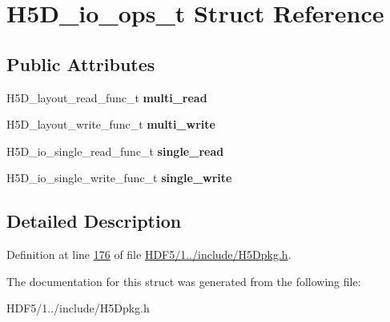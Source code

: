 \hypertarget{struct_h5_d__io__ops__t}{}\section{H5\+D\+\_\+io\+\_\+ops\+\_\+t Struct Reference}
\label{struct_h5_d__io__ops__t}
\subsection*{Public Attributes}
\begin{DoxyCompactItemize}
\item 
\mbox{\label{struct_h5_d__io__ops__t_a7a51ff87a7777232ccfe62df847ec2ee}} 
H5\+D\+\_\+layout\+\_\+read\+\_\+func\+\_\+t {\bfseries multi\+\_\+read}
\item 
\mbox{\label{struct_h5_d__io__ops__t_a969ef89e866eb76e7f628d31e95f99ac}} 
H5\+D\+\_\+layout\+\_\+write\+\_\+func\+\_\+t {\bfseries multi\+\_\+write}
\item 
\mbox{\label{struct_h5_d__io__ops__t_a39f867cfaa25ca0f9c9d2232741fa48f}} 
H5\+D\+\_\+io\+\_\+single\+\_\+read\+\_\+func\+\_\+t {\bfseries single\+\_\+read}
\item 
\mbox{\label{struct_h5_d__io__ops__t_ada65add65cc75b566626b00f377e9b38}} 
H5\+D\+\_\+io\+\_\+single\+\_\+write\+\_\+func\+\_\+t {\bfseries single\+\_\+write}
\end{DoxyCompactItemize}


\subsection{Detailed Description}


Definition at line \hyperlink{_h_d_f5_21_810_81_2include_2_h5_dpkg_8h_source_l00176}{176} of file \hyperlink{_h_d_f5_21_810_81_2include_2_h5_dpkg_8h_source}{H\+D\+F5/1../include/\+H5\+Dpkg.\+h}.



The documentation for this struct was generated from the following file\+:\begin{DoxyCompactItemize}
\item 
H\+D\+F5/1../include/\+H5\+Dpkg.\+h\end{DoxyCompactItemize}
